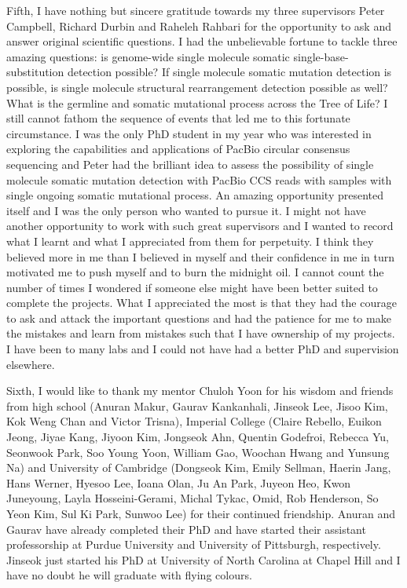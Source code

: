 \begin{acknowledgements}
Fifth, I have nothing but sincere gratitude towards my three supervisors Peter Campbell, Richard Durbin and Raheleh Rahbari for the opportunity to ask and answer original scientific questions. I had the unbelievable fortune to tackle three amazing questions: is genome-wide single molecule somatic single-base-substitution detection possible? If single molecule somatic mutation detection is possible, is single molecule structural rearrangement detection possible as well? What is the germline and somatic mutational process across the Tree of Life? I still cannot fathom the sequence of events that led me to this fortunate circumstance. I was the only PhD student in my year who was interested in exploring the capabilities and applications of PacBio circular consensus sequencing and Peter had the brilliant idea to assess the possibility of single molecule somatic mutation detection with PacBio CCS reads with samples with single ongoing somatic mutational process. An amazing opportunity presented itself and I was the only person who wanted to pursue it. I might not have another opportunity to work with such great supervisors and I wanted to record what I learnt and what I appreciated from them for perpetuity. I think they believed more in me than I believed in myself and their confidence in me in turn motivated me to push myself and to burn the midnight oil. I cannot count the number of times I wondered if someone else might have been better suited to complete the projects. What I appreciated the most is that they had the courage to ask and attack the important questions and had the patience for me to make the mistakes and learn from mistakes such that I have ownership of my projects. I have been to many labs and I could not have had a better PhD and supervision elsewhere. 

Sixth, I would like to thank my mentor Chuloh Yoon for his wisdom and friends from high school (Anuran Makur, Gaurav Kankanhali, Jinseok Lee, Jisoo Kim, Kok Weng Chan and Victor Trisna), Imperial College (Claire Rebello, Euikon Jeong,  Jiyae Kang, Jiyoon Kim, Jongseok Ahn, Quentin Godefroi, Rebecca Yu, Seonwook Park, Soo Young Yoon, William Gao, Woochan Hwang and Yunsung Na) and University of Cambridge (Dongseok Kim, Emily Sellman, Haerin Jang, Hans Werner, Hyesoo Lee, Ioana Olan, Ju An Park, Juyeon Heo, Kwon Juneyoung, Layla Hosseini-Gerami, Michal Tykac, Omid, Rob Henderson, So Yeon Kim, Sul Ki Park, Sunwoo Lee) for their continued friendship. Anuran and Gaurav have already completed their PhD and have started their assistant professorship at Purdue University and University of Pittsburgh, respectively. Jinseok just started his PhD at University of North Carolina at Chapel Hill and I have no doubt he will graduate with flying colours.  


\end{acknowledgements}
